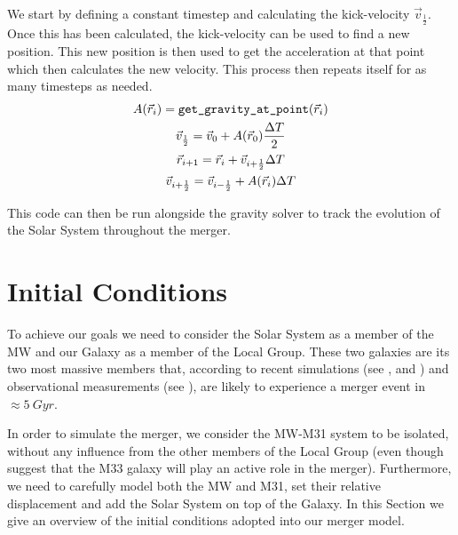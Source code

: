 \documentclass[a4paper,12pt, english]{article}
\begin{document}
\smallskip
We start by defining a constant timestep and calculating the kick-velocity  $\vec{v}_{\frac{1}{2}}$. Once this has been calculated, the kick-velocity can be used to find a new position. This new position is then used to get the acceleration at that point which then calculates the new velocity. This process then repeats itself for as many timesteps as needed.
\begin{equation}
\begin{gathered}
    A(\vec{r}_i) = \verb+get_gravity_at_point+(\vec{r}_i) \\
    \vec{v}_{\frac{1}{2}} = \vec{v}_0 + A(\vec{r}_0)\frac{\Delta T}{2}\\
    \vec{r}_{i+1} = \vec{r}_i + \vec{v}_{i+\frac{1}{2}}\Delta T \\
    \vec{v}_{i+\frac{1}{2}} = \vec{v}_{i-\frac{1}{2}} + A(\vec{r}_i)\Delta T
\end{gathered}
\end{equation}\par
\smallskip
This code can then be run alongside the gravity solver to track the evolution of the Solar System throughout the merger.\par
\newpage

\section{Initial Conditions}
\label{initial-conditions}
To achieve our goals we need to consider the Solar System as a member of the MW and our Galaxy as a member of the Local Group. These two galaxies are its two most massive members that, according to recent simulations (see \textcite{Cox_2008}, \textcite{van_der_Marel_2019} and \textcite{Schiavi_2019}) and observational measurements (see \textcite{van_der_Marel_2012b}), are likely to experience a merger event in \(\approx 5\: Gyr\).\par
\smallskip
In order to simulate the merger, we consider the MW-M31 system to be isolated, without any influence from the other members of the Local Group (even though \textcite{van_der_Marel_2012b} suggest that the M33 galaxy will play an active role in the merger). Furthermore, we need to carefully model both the MW and M31, set their relative displacement and add the Solar System on top of the Galaxy. In this Section we give an overview of the initial conditions adopted into our merger model.\par
\smallskip
\end{document}

